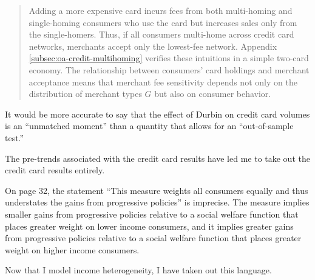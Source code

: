 \documentclass[main.tex]{subfiles}
\begin{document}
\begin{refsection}
\begin{quotation}
    Adding a more expensive card incurs fees from both multi-homing and single-homing consumers who use the card but increases sales only from the single-homers.
    Thus, if all consumers multi-home across credit card networks, merchants accept only the lowest-fee network.
    Appendix \ref{subsec:oa-credit-multihoming} verifies these intuitions in a simple two-card economy.
    The relationship between consumers' card holdings and merchant acceptance means that merchant fee sensitivity depends not only on the distribution of merchant types $G$ but also on consumer behavior.
\end{quotation}

\begin{refcommentnoclear}
It would be more accurate to say that the effect of Durbin on credit card volumes is an “unmatched moment” than a quantity that allows for an “out-of-sample test.”
\end{refcommentnoclear}

The pre-trends associated with the credit card results have led me to take out the credit card results entirely.

\begin{refcommentnoclear}
On page 32, the statement “This measure weights all consumers equally and thus understates the gains from progressive policies” is imprecise.
The measure implies smaller gains from progressive policies relative to a social welfare function that places greater weight on lower income consumers, and it implies greater gains from progressive policies relative to a social welfare function that places greater weight on higher income consumers.
\end{refcommentnoclear}

Now that I model income heterogeneity, I have taken out this language.

\clearpage
\printbibliography
\end{refsection}
\clearpage

\setcounter{footnote}{0}
\setcounter{page}{1}
\renewcommand{\thepage}{R2-\arabic{page}}


\end{document}

